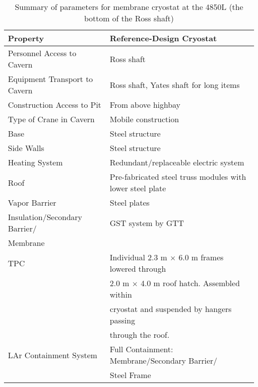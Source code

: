 
\begin{table}
\caption{Summary of parameters for membrane cryostat at the 4850L (the bottom of the Ross shaft)} 
\label{table:cryo-reqs}
\begin{tabular}[htbp]{| p{}|p{}|}
\hline 
\textbf{Property} & \textbf{Reference-Design Cryostat}\\
\hline\hline
Personnel Access to Cavern & Ross shaft\\
\hline
Equipment Transport to Cavern & Ross shaft, Yates shaft for long items \\
\hline
Construction Access to Pit & From above highbay \\
\hline
Type of Crane in Cavern & Mobile construction \\
\hline
Base & Steel structure \\
\hline
Side Walls & Steel structure \\
\hline
Heating System & Redundant/replaceable electric system \\
\hline
Roof & Pre-fabricated steel truss modules with lower steel plate \\
\hline
Vapor Barrier & Steel plates  \\
\hline
Insulation/Secondary Barrier/ & GST system by GTT \\
Membrane & \\
\hline
TPC & Individual 2.3 m $\times$ 6.0 m frames lowered through \\
    & 2.0 m $\times$ 4.0 m roof hatch. Assembled within \\
    & cryostat and suspended by hangers passing \\
    & through the roof. \\
\hline
LAr Containment System & Full Containment: Membrane/Secondary Barrier/ \\
                       & Steel Frame \\
\hline
\end{tabular} 
\end{table}





